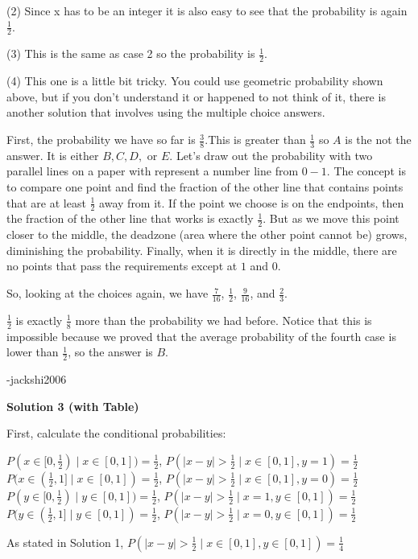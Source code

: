 \begin{enumerate}
 (2) Since x has to be an integer it is also easy to see that the probability is again $\frac{1}{2}$.

 (3) This is the same as case 2 so the probability is $\frac{1}{2}$.

 (4) This one is a little bit tricky. You could use geometric probability shown above, but if you don't understand it or happened to not think of it, there is another solution that involves using the multiple choice answers. 

 First, the probability we have so far is $\frac{3}{8}$.This is greater than $\frac{1}{3}$ so $A$ is the not the answer. It is either $B, C, D,$ or $E$. Let's draw out the probability with two parallel lines on a paper with represent a number line from $0-1$. The concept is to compare one point and find the fraction of the other line that contains points that are at least $\frac{1}{2}$ away from it. If the point we choose is on the endpoints, then the fraction of the other line that works is exactly $\frac{1}{2}$. But as we move this point closer to the middle, the deadzone (area where the other point cannot be) grows, diminishing the probability. Finally, when it is directly in the middle, there are no points that pass the requirements except at $1$ and $0$.

 So, looking at the choices again, we have $\frac{7}{16}$, $\frac{1}{2}$, $\frac{9}{16}$, and $\frac{2}{3}$. 

 $\frac{1}{2}$ is exactly $\frac{1}{8}$ more than the probability we had before. Notice that this is impossible because we proved that the average probability of the fourth case is lower than $\frac{1}{2}$, so the answer is $\boxed{B}$.

 -jackshi2006

 



\textbf{Solution 3 (with Table)}

First, calculate the conditional probabilities:

 $P(x\in[0,\frac{1}{2}) \mid x\in[0,1]) = \frac{1}{2}$,  $P(|x-y|>\frac{1}{2} \mid x\in[0,1], y=1) = \frac{1}{2}$
$P(x\in(\frac{1}{2},1] \mid x\in[0,1]) = \frac{1}{2}$,  $P(|x-y|>\frac{1}{2} \mid x\in[0,1], y=0) = \frac{1}{2}$
$P(y\in[0,\frac{1}{2}) \mid y\in[0,1]) = \frac{1}{2}$,  $P(|x-y|>\frac{1}{2} \mid x=1, y\in[0,1]) = \frac{1}{2}$
$P(y\in(\frac{1}{2},1] \mid y\in[0,1]) = \frac{1}{2}$,  $P(|x-y|>\frac{1}{2} \mid x=0, y\in[0,1]) = \frac{1}{2}$

 As stated in Solution 1, $P(|x-y|>\frac{1}{2} \mid x\in[0,1], y\in[0,1]) = \frac{1}{4}$


\end{enumerate}

